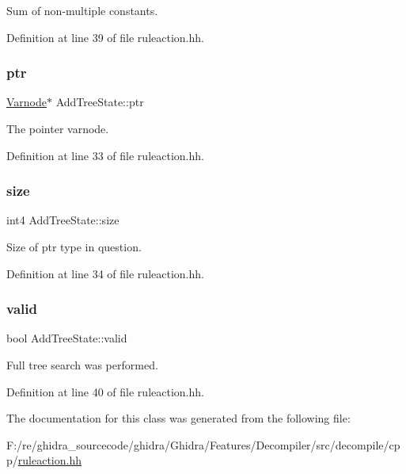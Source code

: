 Sum of non-\/multiple constants. 



Definition at line 39 of file ruleaction.\+hh.

\mbox{\label{class_add_tree_state_a18bd4ef288bdc8a93a620c4aec983668}} 
\subsubsection{\texorpdfstring{ptr}{ptr}}
{\footnotesize\ttfamily \mbox{\hyperlink{class_varnode}{Varnode}}$\ast$ Add\+Tree\+State\+::ptr}



The pointer varnode. 



Definition at line 33 of file ruleaction.\+hh.

\mbox{\label{class_add_tree_state_a535bcd4be85c95843d2cae3572e027a3}} 
\subsubsection{\texorpdfstring{size}{size}}
{\footnotesize\ttfamily int4 Add\+Tree\+State\+::size}



Size of ptr type in question. 



Definition at line 34 of file ruleaction.\+hh.

\mbox{\label{class_add_tree_state_aac866a2b0c8bd9cb9e30840195a70293}} 
\subsubsection{\texorpdfstring{valid}{valid}}
{\footnotesize\ttfamily bool Add\+Tree\+State\+::valid}



Full tree search was performed. 



Definition at line 40 of file ruleaction.\+hh.



The documentation for this class was generated from the following file\+:\begin{DoxyCompactItemize}
\item 
F\+:/re/ghidra\+\_\+sourcecode/ghidra/\+Ghidra/\+Features/\+Decompiler/src/decompile/cpp/\mbox{\hyperlink{ruleaction_8hh}{ruleaction.\+hh}}\end{DoxyCompactItemize}
